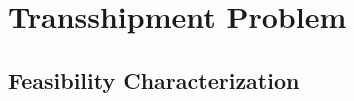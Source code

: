 \documentclass[../../main.tex]{subfiles}
\begin{document}
\section{Transshipment Problem}






\subsection{Feasibility Characterization}\label{sec:tp_feasiblity-characterization}
\end{document}
